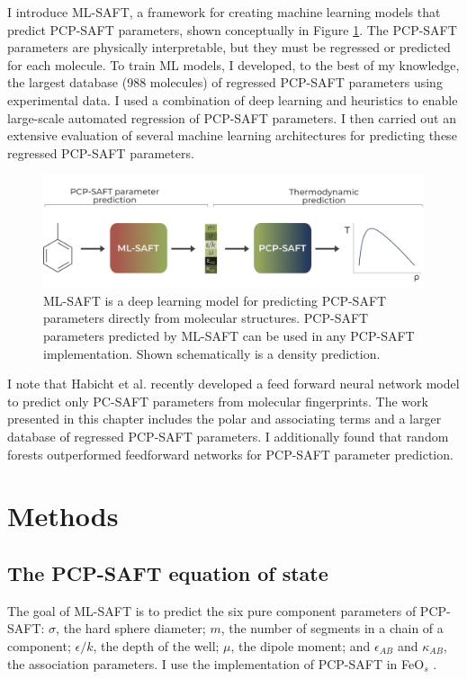 I introduce ML-SAFT, a framework for creating machine learning models that predict PCP-SAFT parameters, shown conceptually in Figure \ref{fig:ML-SAFT_workflow}. The PCP-SAFT parameters are physically interpretable, but they must be regressed or predicted for each molecule.  To train ML models, I developed, to the best of my knowledge, the largest database (988 molecules) of regressed PCP-SAFT parameters using experimental data. I used a combination of deep learning and heuristics to enable large-scale automated regression of PCP-SAFT parameters. I then carried out an extensive evaluation of several machine learning architectures for predicting these regressed PCP-SAFT parameters.

\begin{figure}
    \centering
    \includegraphics[width=\textwidth]{gfx/Chapter08/mlsaft_workflow.png}
    \caption{ML-SAFT is a deep learning model for predicting PCP-SAFT parameters directly from molecular structures. PCP-SAFT parameters predicted by ML-SAFT can be used in any PCP-SAFT implementation. Shown schematically is a density prediction.}
    \label{fig:ML-SAFT_workflow}
\end{figure}

I note that Habicht et al. \cite{Habicht2023} recently developed a feed forward neural network model to predict only PC-SAFT parameters from molecular fingerprints. The work presented in this chapter includes the polar and associating terms and a larger database of regressed PCP-SAFT parameters. I additionally found that random forests outperformed feedforward networks for PCP-SAFT parameter prediction.


\section{Methods}

\subsection{The PCP-SAFT equation of state}

The goal of ML-SAFT is to predict the six pure component parameters of PCP-SAFT: $\sigma$, the hard sphere diameter; $m$, the number of segments in a chain of a component; $\epsilon/k$, the depth of the well; $\mu$, the dipole moment; and $\epsilon_{AB}$ and $\kappa_{AB}$, the association parameters. I use the implementation of PCP-SAFT in FeO$_{s}$ \cite{Rehner2023}.

